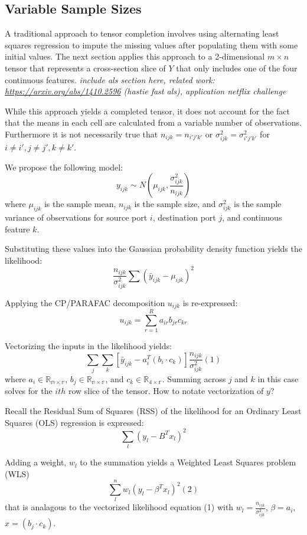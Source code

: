 \documentclass[12pt,twoside]{dukestatscithesis}
\theoremstyle{definition}
\theoremstyle{definition}
\theoremstyle{definition}
\theoremstyle{remark}
\begin{document}
\subsection{Variable Sample Sizes}\label{variable-sample-sizes}

A traditional approach to tensor completion involves using alternating
least squares regression to impute the missing values after populating
them with some initial values. The next section applies this approach to
a 2-dimensional \(m \times n\) tensor that represents a cross-section
slice of \(Y\) that only includes one of the four continuous features.
\emph{include als section here, related work:
\url{https://arxiv.org/abs/1410.2596} (hastie fast als), application
netflix challenge}

While this approach yields a completed tensor, it does not account for
the fact that the means in each cell are calculated from a variable
number of observations. Furthermore it is not necessarily true that
\(n_{ijk} = n_{i'j'k'}\) or \(\sigma^2_{ijk} = \sigma^2_{i'j'k'}\) for
\(i \neq i', j \neq j', k \neq k'\).

We propose the following model:
\[y_{ijk} \sim N(\mu_{ijk}, \frac{\sigma^2_{ijk}}{n_{ijk}})\] where
\(\mu_{ijk}\) is the sample mean, \(n_{ijk}\) is the sample size, and
\(\sigma^2_{ijk}\) is the sample variance of observations for source
port \(i\), destination port \(j\), and continuous feature \(k\).

Substituting these values into the Gaussian probability density function
yields the likelihood:
\[\frac{n_{ijk}}{\sigma^2_{ijk}}\sum(\bar y_{ijk} - \mu_{ijk})^2\]

Applying the CP/PARAFAC decomposition \(u_{ijk}\) is re-expressed:
\[u_{ijk} = \sum_{r=1}^Ra_{ir}b_{jr}c_{kr}\]

Vectorizing the inputs in the likelihood yields:
\[\sum_j\sum_k[\bar y_{ijk} - a_i^T(b_i \cdotp c_k)]\frac{n_{ijk}}{\sigma^2_{ijk}} (1)\]
where \(a_i \in \mathbb{R_{m \times r}}\),
\(b_j \in \mathbb{R_{n \times r}}\), and
\(c_k \in \mathbb{R_{4 \times r}}\). Summing across \(j\) and \(k\) in
this case solves for the \(ith\) row slice of the tensor. How to notate
vectorization of \(y\)?

Recall the Residual Sum of Squares (RSS) of the likelihood for an
Ordinary Least Squares (OLS) regression is expressed:
\[\sum_l(y_l-B^Tx_l)^2\]

Adding a weight, \(w_l\) to the summation yields a Weighted Least
Squares problem (WLS) \[\sum_l^nw_l(y_l-\beta^Tx_l)^2 (2)\] that is
analagous to the vectorized likelihood equation (1) with
\(w_l = \frac{n_{ijk}}{\sigma^2_{ijk}}\), \(\beta = a_i\),
\(x = (b_j \cdotp c_k)\).
\end{document}
